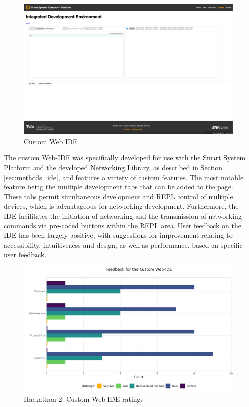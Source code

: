 \begin{figure}[H]
    \centering
    \includegraphics[width=\linewidth]{overleaf/images/ide_raw.png}
    \vspace{\ftspace}
    \caption{Custom Web IDE}
    \vspace{\ftspace}
    \label{fig:ide_raw}
\end{figure}

The custom Web-IDE was specifically developed for use with the Smart System Platform and the developed Networking Library, as described in Section \ref{sec:methods_ide}, and features a variety of custom features. The most notable feature being the multiple development tabs that can be added to the page. These tabs permit simultaneous development and REPL control of multiple devices, which is advantageous for networking development. Furthermore, the IDE facilitates the initiation of networking and the transmission of networking commands via pre-coded buttons within the REPL area. User feedback on the IDE has been largely positive, with suggestions for improvement relating to accessibility, intuitiveness and design, as well as performance, based on specific user feedback.

\begin{figure}[H]
    \centering
    \includegraphics[width=\linewidth]{rstudio/survey/plots/ide.png}
    \vspace{.06\ftspace}
    \caption{Hackathon 2: Custom Web-IDE ratings}
    \label{fig:website}
\end{figure}

